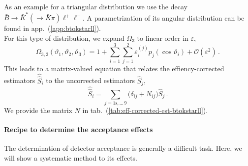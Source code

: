 \documentclass[aps,prd,reprint,nofootinbib,preprintnumbers]{revtex4}
\newcommand{\refapp}[1]{app.~(\ref{app:#1})}
\newcommand{\reftab}[1]{tab.~(\ref{tab:#1})}
\renewcommand{\theta}{\vartheta}
\newcommand{\order}[1]{\mathcal{O}\left({#1}\right)}
\let\eps\varepsilon
\newcommand{\est}[1]{\widehat{#1}}
\newcommand{\wwhat}[1]{\widehat{\widehat{#1}}}
\begin{document}
As an example for a triangular distribution we use the decay $\bar{B}\to\bar{K}^*(\to \bar{K}\pi)\ell^+\ell^-$.
A parametrization of its angular distribution can be found in \refapp{btokstarll}.\\

For this type of distribution, we expand $\Omega_3$ to linear order in $\eps$,
\begin{equation}
    \Omega_{3,2}(\theta_1,\theta_2,\theta_3) = 1 + \sum_{i=1}^3 \sum_{j=1}^2 \eps_i^{(j)} p_j(\cos\theta_i) + \order{\eps^2}\,.
\end{equation}
This leads to a matrix-valued equation that relates the effiency-corrected estimators $\wwhat{S}_i$ to the uncorrected
estimators $\est{S}_j$,
\begin{equation}
    \label{eq:eff-corrected-est-btokstarll}
    \wwhat{S}_i = \sum_{j=1\text{s},\dots\,9} \big(\delta_{ij} + N_{ij}\big) \est{S}_j\,.
\end{equation}
We provide the matrix $N$ in \reftab{eff-corrected-est-btokstarll}.\\

\paragraph{Recipe to determine the acceptance effects}

The determination of detector acceptance is generally a difficult task. Here, we will show a systematic
method to its effects.\\
\end{document}
